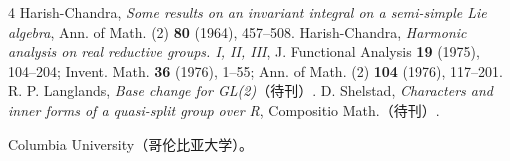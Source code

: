 \begin{thebibliography}{4}
 Harish-Chandra, \textit{Some results on an invariant integral on a semi-simple Lie algebra}, Ann. of Math. (2) \textbf{80} (1964), 457--508.
 Harish-Chandra, \textit{Harmonic analysis on real reductive groups. I, II, III}, J. Functional Analysis \textbf{19} (1975), 104--204; Invent. Math. \textbf{36} (1976), 1--55; Ann. of Math. (2) \textbf{104} (1976), 117--201.
 R. P. Langlands, \textit{Base change for GL(2)}（待刊）.
 D. Shelstad, \textit{Characters and inner forms of a quasi-split group over R}, Compositio Math.（待刊）.
\end{thebibliography}
\noindent Columbia University（哥伦比亚大学）。

